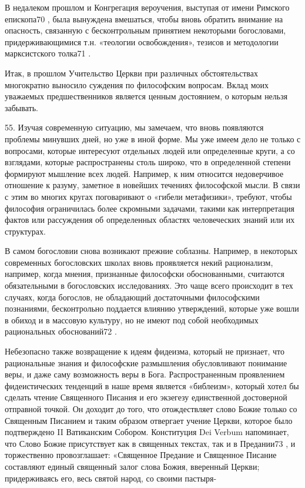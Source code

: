 \documentclass[a5paper,10pt]{article}
\begin{document}
В недалеком прошлом и Конгрегация вероучения, выступая от имени Римского
епископа70 , была вынуждена вмешаться, чтобы вновь обратить внимание на
опасность, связанную с бесконтрольным принятием некоторыми богословами,
придерживающимися т.н. «теологии освобождения», тезисов и методологии
марксистского толка71 .

Итак, в прошлом Учительство Церкви при различных обстоятельствах многократно
выносило суждения по философским вопросам. Вклад моих уважаемых
предшественников является ценным достоянием, о которым нельзя забывать.

55. Изучая современную ситуацию, мы замечаем, что вновь появляются проблемы
минувших дней, но уже в иной форме. Мы уже имеем дело не только с вопросами,
которые интересуют отдельных людей или определенные круги, а со взглядами,
которые распространены столь широко, что в определенной степени формируют
мышление всех людей. Например, к ним относится недоверчивое отношение к разуму,
заметное в новейших течениях философской мысли. В связи с этим во многих кругах
поговаривают о «гибели метафизики», требуют, чтобы философия ограничилась более
скромными задачами, такими как интерпретация фактов или рассуждения об
определенных областях человеческих знаний или их структурах.

В самом богословии снова возникают прежние соблазны. Например, в некоторых
современных богословских школах вновь проявляется некий рационализм, например,
когда мнения, признанные философски обоснованными, считаются обязательными в
богословских исследованиях. Это чаще всего происходит в тех случаях, когда
богослов, не обладающий достаточными философскими познаниями, бесконтрольно
поддается влиянию утверждений, которые уже вошли в обиход и в массовую
культуру, но не имеют под собой необходимых рациональных обоснований72 .

Небезопасно также возвращение к идеям фидеизма, который не признает, что
рациональные знания и философские размышления обусловливают понимание веры, и
даже саму возможность веры в Бога. Распространенным проявлением фидеистических
тенденций в наше время является «библеизм», который хотел бы сделать чтение
Священного Писания и его экзегезу единственной достоверной отправной точкой. Он
доходит до того, что отождествляет слово Божие только со Священным Писанием и
таким образом отвергает учение Церкви, которое было подтверждено II Ватиканским
Собором. Конституция Dei Verbum напоминает, что Слово Божие присутствует как в
священных текстах, так и в Предании73 , и торжественно провозглашает:
«Священное Предание и Священное Писание составляют единый священный залог слова
Божия, вверенный Церкви; придерживаясь его, весь святой народ, со своими
пастыря-
\end{document}
